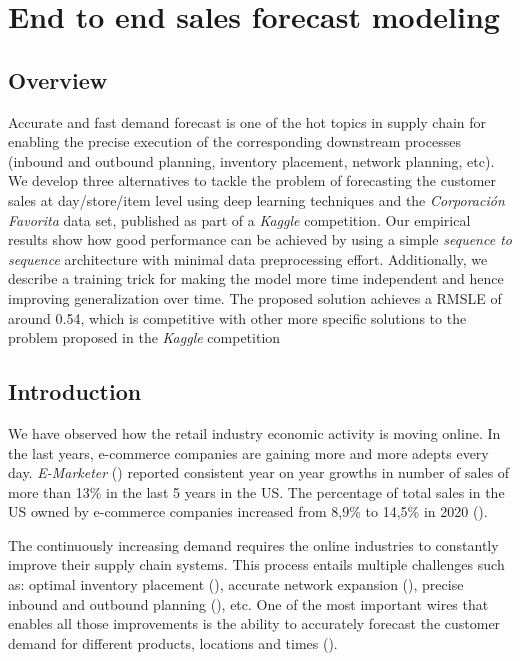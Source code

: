 \chapter{End to end sales forecast modeling}

\section{Overview}
Accurate and fast demand forecast is one of the hot topics in supply chain for enabling the precise execution of the corresponding downstream processes (inbound and outbound planning, inventory placement, network planning, etc). We develop three alternatives to tackle the problem of forecasting the customer sales at day/store/item level using deep learning techniques and the \textit{Corporación Favorita} data set, published as part of a \textit{Kaggle} competition. Our empirical results show how good performance can be achieved by using a simple \textit{sequence to sequence} architecture with minimal data preprocessing effort. Additionally, we describe a training trick for making the model more time independent and hence improving generalization over time. The proposed solution achieves a RMSLE of around 0.54, which is competitive with other more specific solutions to the problem proposed in the \textit{Kaggle} competition


\section{Introduction}
We have observed how the retail industry economic activity is moving online. In the last years, e-commerce companies are gaining more and more adepts every day. \textit{E-Marketer} (\cite{emarketer2019, emarketer2020}) reported consistent year on year growths in number of sales of more than 13\% in the last 5 years in the US. The percentage of total sales in the US owned by e-commerce companies increased from 8,9\% to 14,5\% in 2020 (\cite{emarketer2019, emarketer2020}).

The continuously increasing demand requires the online industries to constantly improve their supply chain systems. This process entails multiple challenges such as: optimal inventory placement (\cite{graves2008}), accurate network expansion (\cite{hossein2017}), precise inbound and outbound planning (\cite{kaipia2009}), etc. One of the most important wires that enables all those improvements is the ability to accurately forecast the customer demand for different products, locations and times (\cite{forslund2007}).


